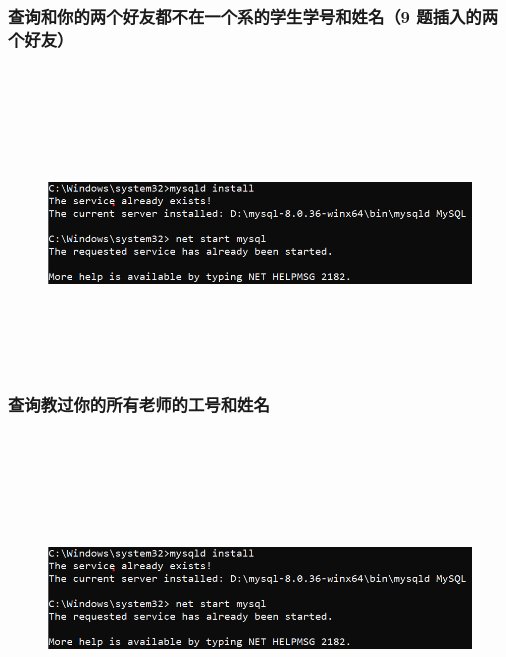 \documentclass{ctexart}
\begin{document}
\subsubsection{查询和你的两个好友都不在一个系的学生学号和姓名（9 题插入的两个好友）}
\begin{lstlisting}[language=sql]
	
\end{lstlisting}
\begin{figure}[H]
	\centering 
	\includegraphics[height=7cm,width=14cm]{1.png}
	\end{figure}
\subsubsection{查询教过你的所有老师的工号和姓名}
\begin{lstlisting}[language=sql]
	
\end{lstlisting}
\begin{figure}[H]
	\centering 
	\includegraphics[height=7cm,width=14cm]{1.png}
	\end{figure}
\end{document}

